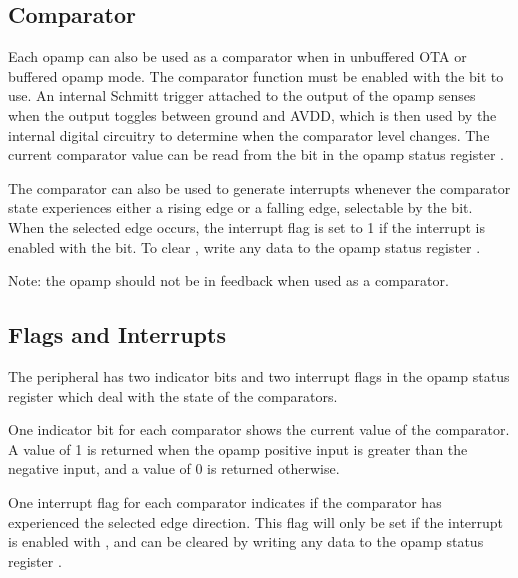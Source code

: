 \subsection{Comparator}

Each opamp can also be used as a comparator when in unbuffered OTA or buffered opamp mode. The comparator function must be enabled with the  bit to use. An internal Schmitt trigger attached to the output of the opamp senses when the output toggles between ground and AVDD, which is then used by the internal digital circuitry to determine when the comparator level changes. The current comparator value can be read from the  bit in the opamp status register .

The comparator can also be used to generate interrupts whenever the comparator state experiences either a rising edge or a falling edge, selectable by the  bit. When the selected edge occurs, the interrupt flag  is set to 1 if the interrupt is enabled with the  bit. To clear , write any data to the opamp status register .

Note: the opamp should not be in feedback when used as a comparator.



\subsection{Flags and Interrupts}

The  peripheral has two indicator bits and two interrupt flags in the opamp status register  which deal with the state of the comparators.

One indicator bit  for each comparator shows the current value of the comparator. A value of 1 is returned when the opamp positive input is greater than the negative input, and a value of 0 is returned otherwise.

One interrupt flag  for each comparator indicates if the comparator has experienced the selected edge direction. This flag will only be set if the interrupt is enabled with , and can be cleared by writing any data to the opamp status register .
